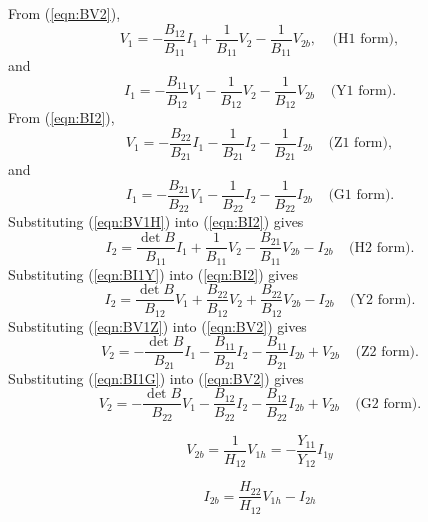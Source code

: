\documentclass[a4paper, 12pt]{article}
\newcommand{\bigspace}{\;\;\;\;}
\newcommand{\refeqn}[1]{\mbox{(\ref{eqn:#1})}}
\begin{document}
From \refeqn{BV2},
%
\begin{equation}
  V_1 = -\frac{B_{12}}{B_{11}} I_1 + \frac{1}{B_{11}} V_2 - \frac{1}{B_{11}} V_{2b},
\bigspace \mbox{(H1 form)},
\label{eqn:BV1H}
\end{equation}
%
and
%
\begin{equation}
  I_1  =  -\frac{B_{11}}{B_{12}} V_1 - \frac{1}{B_{12}} V_2 - \frac{1}{B_{12}} V_{2b} \bigspace \mbox{(Y1 form)}.
\label{eqn:BI1Y}
\end{equation}
%
From \refeqn{BI2},
%
\begin{equation}
  V_1 = -\frac{B_{22}}{B_{21}} I_1 - \frac{1}{B_{21}} I_2  - \frac{1}{B_{21}} I_{2b} \bigspace \mbox{(Z1 form)},
\label{eqn:BV1Z}
\end{equation}
%
and
%
\begin{equation}
  I_1 = -\frac{B_{21}}{B_{22}} V_1 - \frac{1}{B_{22}} I_2 - \frac{1}{B_{22}} I_{2b}
\bigspace \mbox{(G1 form)}.
\label{eqn:BI1G}
\end{equation}
%
Substituting \refeqn{BV1H} into \refeqn{BI2} gives
%
\begin{equation}
  I_2 = \frac{\det{B}}{B_{11}} I_1 + \frac{1}{B_{11}} V_2 - \frac{B_{21}}{B_{11}} V_{2b} - I_{2b} \bigspace \mbox{(H2 form)}.
\label{eqn:BI2H}
\end{equation}
%
Substituting \refeqn{BI1Y} into \refeqn{BI2} gives
%
\begin{equation}
  I_2 = \frac{\det B}{B_{12}} V_1 + \frac{B_{22}}{B_{12}} V_2 + \frac{B_{22}}{B_{12}} V_{2b} - I_{2b} \bigspace \mbox{(Y2 form)}.
\label{eqn:BI2Y}
\end{equation}
%
Substituting \refeqn{BV1Z} into \refeqn{BV2} gives
%
\begin{equation}
  V_2 = -\frac{\det B}{B_{21}} I_1 - \frac{B_{11}}{B_{21}} I_2  - \frac{B_{11}}{B_{21}} I_{2b} + V_{2b}  \bigspace \mbox{(Z2 form)}.
\label{eqn:BV2Z}
\end{equation}
%
Substituting \refeqn{BI1G} into \refeqn{BV2} gives
%
\begin{equation}
  V_2 = -\frac{\det B}{B_{22}} V_1 - \frac{B_{12}}{B_{22}} I_2  - \frac{B_{12}}{B_{22}} I_{2b} + V_{2b}  \bigspace \mbox{(G2 form)}.
\label{eqn:BV2G}
\end{equation}

\begin{equation}
  V_{2b} = \frac{1}{H_{12}} V_{1h} = -\frac{Y_{11}}{Y_{12}} I_{1y}
\end{equation}

\begin{equation}
  I_{2b} = \frac{H_{22}}{H_{12}} V_{1h} - I_{2h}
\end{equation}
\end{document}
